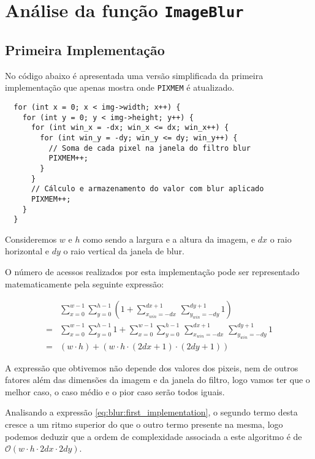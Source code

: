 \cprotect\chapter{Análise da função \Verb|ImageBlur|}

\section{Primeira Implementação}

No código abaixo é apresentada uma versão simplificada da primeira implementação
que apenas mostra onde \Verb|PIXMEM| é atualizado.

\begin{listing}[H]
	\centering
	\begin{verbatim}
  for (int x = 0; x < img->width; x++) {
    for (int y = 0; y < img->height; y++) {
      for (int win_x = -dx; win_x <= dx; win_x++) {
        for (int win_y = -dy; win_y <= dy; win_y++) {
          // Soma de cada pixel na janela do filtro blur
          PIXMEM++;
        }
      }
      // Cálculo e armazenamento do valor com blur aplicado
      PIXMEM++;
    }
  }
  \end{verbatim}
\end{listing}

Consideremos $w$ e $h$ como sendo a largura e a altura da imagem, e $dx$
o raio horizontal e $dy$ o raio vertical da janela de blur.

O número de acessos realizados por esta implementação pode ser representado
matematicamente pela seguinte expressão:

\begin{align}
	  & \sum_{x = 0}^{w - 1} \sum_{y = 0}^{h - 1} \left(
	1 +
	\sum_{x_{win} = -dx}^{dx+1} \,
	\sum_{y_{win} = -dy}^{dy+1} 1
	\right)                                                          \\
	= & \sum_{x = 0}^{w - 1} \sum_{y = 0}^{h - 1} 1 +
	\sum_{x = 0}^{w - 1} \sum_{y = 0}^{h - 1} \,
	\sum_{x_{win} = -dx}^{dx + 1} \, \sum_{y_{win} = -dy}^{dy + 1} 1 \\
	= & (w \cdot h) + (w \cdot h \cdot (2dx + 1) \cdot (2dy + 1))
	\label{eq:blur:first_implementation}
\end{align}

A expressão que obtivemos não depende dos valores dos pixeis, nem de outros
fatores além das dimensões da imagem e da janela do filtro, logo vamos ter que o
melhor caso, o caso médio e o pior caso serão todos iguais.

Analisando a expressão \eqref{eq:blur:first_implementation}, o segundo termo
desta cresce a um ritmo superior do que o outro termo presente na mesma, logo
podemos deduzir que a ordem de complexidade associada a este algoritmo é de
$\mathcal{O}(w \cdot h \cdot 2dx \cdot 2dy)$.

